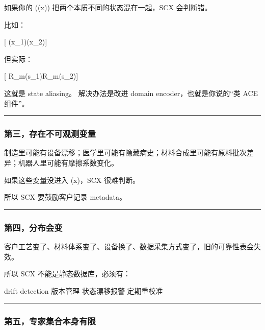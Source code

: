 \documentclass[
  12pt,
]{ctexart}
\newenvironment{Shaded}{}{}
\newcommand{\NormalTok}[1]{#1}
\begin{document}
如果你的 (\phi(x)) 把两个本质不同的状态混在一起，SCX 会判断错。

比如：

{[} \phi(x\_1)\approx \phi(x\_2){]}

但实际：

{[} R\_m(s\_1)\neq R\_m(s\_2){]}

这就是 state aliasing。 解决办法是改进 domain encoder，也就是你说的``类
ACE 组件''。

\begin{center}\rule{0.5\linewidth}{0.5pt}\end{center}

\subsubsection{第三，存在不可观测变量}\label{ux7b2cux4e09ux5b58ux5728ux4e0dux53efux89c2ux6d4bux53d8ux91cf}

制造里可能有设备漂移；医学里可能有隐藏病史；材料合成里可能有原料批次差异；机器人里可能有摩擦系数变化。

如果这些变量没进入 (x)，SCX 很难判断。

所以 SCX 要鼓励客户记录 metadata。

\begin{center}\rule{0.5\linewidth}{0.5pt}\end{center}

\subsubsection{第四，分布会变}\label{ux7b2cux56dbux5206ux5e03ux4f1aux53d8}

客户工艺变了、材料体系变了、设备换了、数据采集方式变了，旧的可靠性表会失效。

所以 SCX 不能是静态数据库，必须有：

\begin{Shaded}
\begin{Highlighting}[]
\NormalTok{drift detection}
\NormalTok{版本管理}
\NormalTok{状态漂移报警}
\NormalTok{定期重校准}
\end{Highlighting}
\end{Shaded}

\begin{center}\rule{0.5\linewidth}{0.5pt}\end{center}

\subsubsection{第五，专家集合本身有限}\label{ux7b2cux4e94ux4e13ux5bb6ux96c6ux5408ux672cux8eabux6709ux9650}
\end{document}
